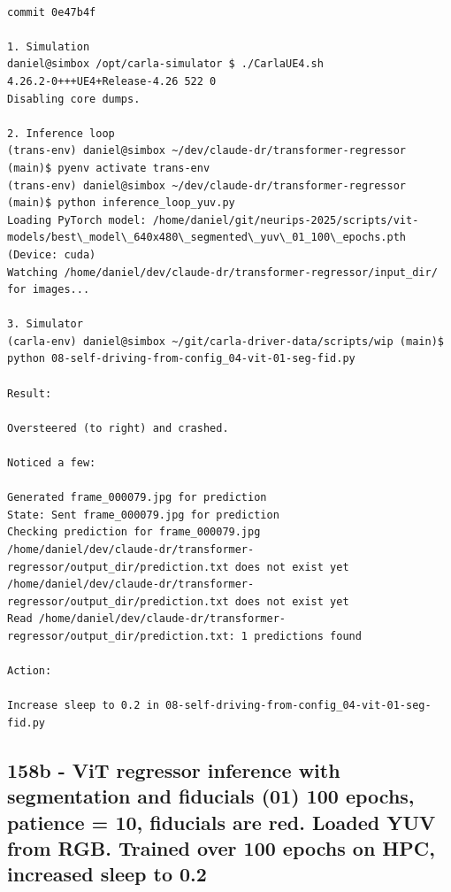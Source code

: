 \begin{verbatim}

commit 0e47b4f

1. Simulation
daniel@simbox /opt/carla-simulator $ ./CarlaUE4.sh 
4.26.2-0+++UE4+Release-4.26 522 0
Disabling core dumps.

2. Inference loop
(trans-env) daniel@simbox ~/dev/claude-dr/transformer-regressor (main)$ pyenv activate trans-env
(trans-env) daniel@simbox ~/dev/claude-dr/transformer-regressor (main)$ python inference_loop_yuv.py 
Loading PyTorch model: /home/daniel/git/neurips-2025/scripts/vit-models/best\_model\_640x480\_segmented\_yuv\_01_100\_epochs.pth (Device: cuda)
Watching /home/daniel/dev/claude-dr/transformer-regressor/input_dir/ for images...

3. Simulator
(carla-env) daniel@simbox ~/git/carla-driver-data/scripts/wip (main)$ python 08-self-driving-from-config_04-vit-01-seg-fid.py 

Result:

Oversteered (to right) and crashed.

Noticed a few:

Generated frame_000079.jpg for prediction
State: Sent frame_000079.jpg for prediction
Checking prediction for frame_000079.jpg
/home/daniel/dev/claude-dr/transformer-regressor/output_dir/prediction.txt does not exist yet
/home/daniel/dev/claude-dr/transformer-regressor/output_dir/prediction.txt does not exist yet
Read /home/daniel/dev/claude-dr/transformer-regressor/output_dir/prediction.txt: 1 predictions found

Action:

Increase sleep to 0.2 in 08-self-driving-from-config_04-vit-01-seg-fid.py 
\end{verbatim}

\subsection{158b - ViT regressor inference with segmentation and fiducials (01) 100 epochs, patience = 10, fiducials are red. Loaded YUV from RGB. Trained over 100 epochs on HPC, increased sleep to 0.2}
\label{app_res:158b}

